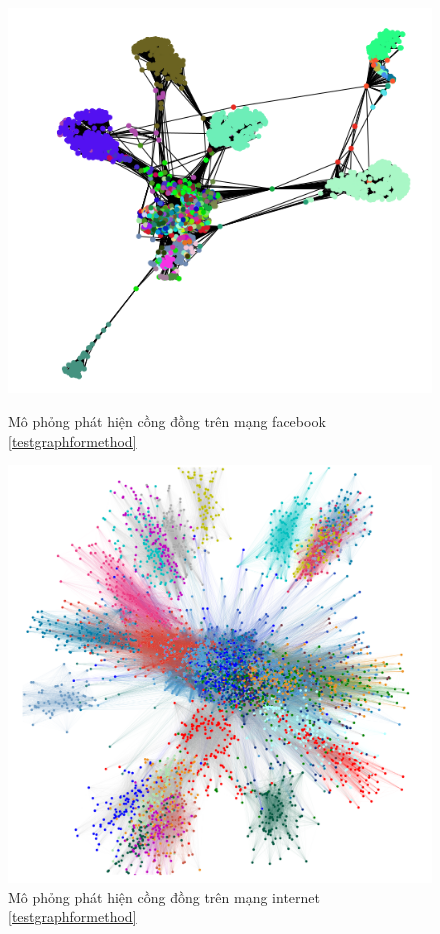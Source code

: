 \begin{figure}[]
	\centering
	\begin{minipage}[t]{0.48\textwidth}
		\centering
		\includegraphics[width=\linewidth]{Chapter3/Chapter3Figs/facebook_demo}
		\caption{Mô phỏng phát hiện cồng đồng trên mạng facebook \ref{testgraphformethod}}
		\label{fig:facebook-demo}
	\end{minipage}
	\begin{minipage}[t]{0.48\textwidth}
		\centering
		\includegraphics[width=0.7\linewidth]{Chapter3/Chapter3Figs/graph}
		\caption{Mô phỏng phát hiện cồng đồng trên mạng internet \ref{testgraphformethod}}
		\label{fig:graph3}
	\end{minipage}    
\end{figure}

